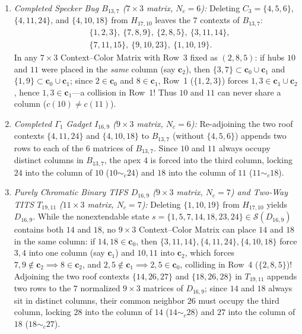 \documentclass[aps,pra,reprint,superscriptaddress,longbibliography,nofootinbib,floatfix,10pt]{revtex4-2}
\theoremstyle{definition}\newtheorem{definition}[theorem]{Definition}
\theoremstyle{remark}\newtheorem{remark}[theorem]{Remark}
\newcommand{\Sc}{\mathcal S}\newcommand{\Cc}{\mathcal C}
\begin{document}
\begin{enumerate}
\item \emph{Completed Specker Bug $B_{13,7}$ ($7\times 3$ matrix, $N_c=6$):} Deleting $C_3=\{4,5,6\}$, $\{4,11,24\}$, and $\{4,10,18\}$ from $H_{17,10}$ leaves the $7$ contexts of $B_{13,7}$:
\[
\begin{aligned}
&\{1,2,3\},\ \{7,8,9\},\ \{2,8,5\},\ \{3,11,14\},\\
&\{7,11,15\},\ \{9,10,23\},\ \{1,10,19\}.
\end{aligned}
\]
In any $7\times 3$ Context--Color Matrix with Row~3 fixed as $(2,8,5)$: if hubs $10$ and $11$ were placed in the \emph{same} column (say $\mathbf{c}_2$), then $\{3,7\}\subset\mathbf{c}_0\cup\mathbf{c}_1$ and $\{1,9\}\subset\mathbf{c}_0\cup\mathbf{c}_1$; since $2\in\mathbf{c}_0$ and $8\in\mathbf{c}_1$, Row~1 ($\{1,2,3\}$) forces $1,3\in\mathbf{c}_1\cup\mathbf{c}_2$, hence $1,3\in\mathbf{c}_1$—a collision in Row~1! Thus $10$ and $11$ can never share a column ($c(10)\neq c(11)$).
\item \emph{Completed $\Gamma_1$ Gadget $I_{16,9}$ ($9\times 3$ matrix, $N_c=6$):} Re-adjoining the two roof contexts $\{4,11,24\}$ and $\{4,10,18\}$ to $B_{13,7}$ (without $\{4,5,6\}$) appends two rows to each of the $6$ matrices of $B_{13,7}$. Since $10$ and $11$ always occupy distinct columns in $B_{13,7}$, the apex $4$ is forced into the third column, locking $24$ into the column of $10$ ($10\sim_c 24$) and $18$ into the column of $11$ ($11\sim_c 18$).
\item \emph{Purely Chromatic Binary TIFS $D_{16,9}$ ($9\times 3$ matrix, $N_c=7$) and Two-Way TITS $T_{19,11}$ ($11\times 3$ matrix, $N_c=7$):} Deleting $\{1,10,19\}$ from $H_{17,10}$ yields $D_{16,9}$. While the nonextendable state $s=\{1,5,7,14,18,23,24\}\in\Sc(D_{16,9})$ contains both $14$ and $18$, no $9\times 3$ Context--Color Matrix can place $14$ and $18$ in the same column: if $14,18\in\mathbf{c}_0$, then $\{3,11,14\},\{4,11,24\},\{4,10,18\}$ force $3,4$ into one column (say $\mathbf{c}_1$) and $10,11$ into $\mathbf{c}_2$, which forces $7,9\notin\mathbf{c}_2\implies 8\in\mathbf{c}_2$, and $2,5\notin\mathbf{c}_1\implies 2,5\in\mathbf{c}_0$, colliding in Row~4 ($\{2,8,5\}$)! Adjoining the two roof contexts $\{14,26,27\}$ and $\{18,26,28\}$ in $T_{19,11}$ appends two rows to the $7$ normalized $9\times 3$ matrices of $D_{16,9}$; since $14$ and $18$ always sit in distinct columns, their common neighbor $26$ must occupy the third column, locking $28$ into the column of $14$ ($14\sim_c 28$) and $27$ into the column of $18$ ($18\sim_c 27$).
\end{enumerate}
\end{document}
